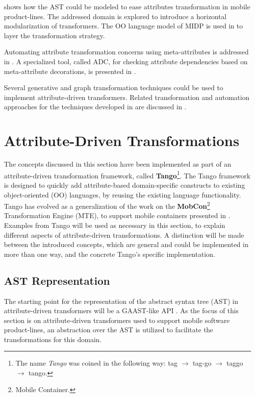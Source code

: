  shows how the AST could be modeled to ease attributes transformation in mobile product-lines. The addressed domain is explored to introduce a horizontal modularization of transformers. The OO language model of MIDP \cite{www.midp-ota} is used in  to layer the transformation strategy.

Automating attribute transformation concerns using meta-attributes is addressed in . A specialized tool, called ADC, for checking attribute dependencies based on meta-attribute decorations, is presented in .

Several generative and graph transformation techniques could be used to implement attribute-driven transformers. Related transformation and automation approaches for the techniques developed in  are discussed in . 

\section{Attribute-Driven Transformations}
\label{sec.attribute.trans}

The concepts discussed in this section have been implemented as part of an attribute-driven transformation framework, called \textbf{Tango}\footnote{The name \textit{Tango} was coined in the following way: tag $\rightarrow$ tag-go $\rightarrow$ taggo $\rightarrow$ tango.}. The Tango framework is designed to quickly add attribute-based domain-specific constructs to existing object-oriented (OO) languages, by reusing the existing language functionality. Tango has evolved as a generalization of the work on the \textbf{MobCon}\footnote{Mobile Container.} Transformation Engine (MTE), to support mobile containers presented in  . Examples from Tango will be used as necessary in this section, to explain different aspects of attribute-driven transformations. A distinction will be made between the introduced concepts, which are general and could be implemented in more than one way, and the concrete Tango's specific implementation.

\subsection{AST Representation}
\label{sec.ast.tango}

The starting point for the representation of the abstract syntax tree (AST) in attribute-driven transformers will be a GAAST-like API . As the focus of this section is on attribute-driven transformers used to support mobile software product-lines, an abstraction over the AST is utilized to facilitate the transformations for this domain. 

